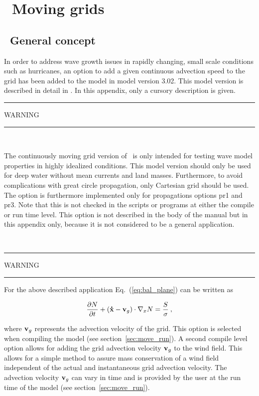 \pagestyle{myheadings} \setcounter{page}{1} \setcounter{footnote}{0}

\section{~Moving grids} \label{app:move}
\newcounters 
\vssub
\subsection{~General concept} \label{sec:move_eqs}
\vssub

In order to address wave growth issues in rapidly changing, small scale
conditions such as hurricanes, an option to add a given continuous advection
speed to the grid has been added to the model in model version 3.02. This
model version is described in detail in \cite{tol:OMOD05b}. In this appendix,
only a cursory description is given.

\begin{center}
\rule[1mm]{55mm}{1.0mm} WARNING \rule[1mm]{55mm}{1.0mm} \\
 \vspace{\baselineskip}
\parbox{120mm}{The continuously moving grid version of \ws\ is only intended 
for testing wave model properties in highly idealized conditions. This model
version should only be used for deep water without mean currents and land
masses. Furthermore, to avoid complications with great circle propagation,
only Cartesian grid should be used. The option is furthermore implemented only
for propagations options {\F pr1} and {\F pr3}. Note that this is not checked
in the scripts or programs at either the compile or run time level.  This
option is not described in the body of the manual but in this appendix only,
because it is not considered to be a general application.} \\
\vspace{\baselineskip}
\rule[1mm]{55mm}{1.0mm} WARNING \rule[1mm]{55mm}{1.0mm}
\end{center}

\noindent
For the above described application Eq.~(\ref{eq:bal_plane}) can be written as

\begin{equation}
\frac{\partial N}{\partial t} + 
\left ( {\bf\dot{x}}-{\bf{v}}_g \right ) \cdot \nabla_x N  = 
\frac{S}{\sigma} \: , \label{eq:bal_move}
\end{equation}

\noindent
where ${\bf{v}}_g$ represents the advection velocity of the grid. This option
is selected when compiling the model (see section~\ref{sec:move_run}). A
second compile level option allows for adding the grid advection velocity
${\bf{v}}_g$ to the wind field. This allows for a simple method to assure mass
conservation of a wind field independent of the actual and instantaneous grid
advection velocity. The advection velocity ${\bf{v}}_g$ can vary in time and
is provided by the user at the run time of the model (see
section~\ref{sec:move_run}).



